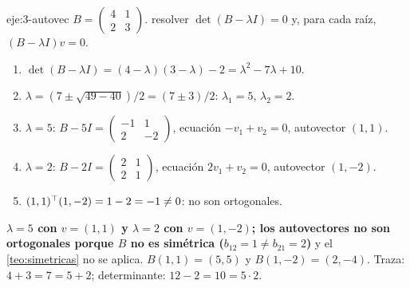 \begin{solucion}{eje:3-autovec}
\datos $B=\begin{pmatrix}4&1\\2&3\end{pmatrix}$.
\planteamiento resolver $\det(B-\lambda I)=0$ y, para cada raíz, $(B-\lambda I)v=0$.
\pasos
\begin{enumerate}[label=\arabic*.]
  \item $\det(B-\lambda I)=(4-\lambda)(3-\lambda)-2=\lambda^{2}-7\lambda+10$.
  \item $\lambda=(7\pm\sqrt{49-40})/2=(7\pm 3)/2$: $\lambda_1=5$, $\lambda_2=2$.
  \item $\lambda=5$: $B-5I=\begin{pmatrix}-1&1\\2&-2\end{pmatrix}$, ecuación $-v_1+v_2=0$, autovector $(1,1)$.
  \item $\lambda=2$: $B-2I=\begin{pmatrix}2&1\\2&1\end{pmatrix}$, ecuación $2v_1+v_2=0$, autovector $(1,-2)$.
  \item $(1,1)^{\top}(1,-2)=1-2=-1\ne 0$: no son ortogonales.
\end{enumerate}
\resultado \textbf{$\lambda=5$ con $v=(1,1)$ y $\lambda=2$ con $v=(1,-2)$; los autovectores no son ortogonales porque $B$ no es simétrica ($b_{12}=1\ne b_{21}=2$)} y el \cref{teo:simetricas} no se aplica.
\comprobacion $B(1,1)=(5,5)$ y $B(1,-2)=(2,-4)$. Traza: $4+3=7=5+2$; determinante: $12-2=10=5\cdot 2$.
\end{solucion}

